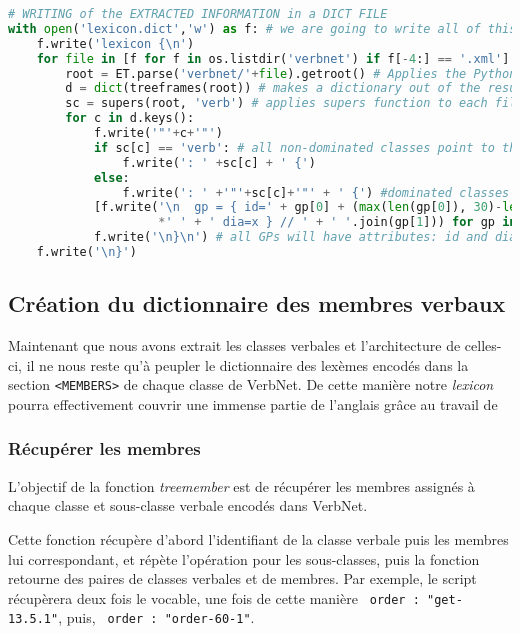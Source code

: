\begin{lstlisting}[language=Python, caption = Importation de l'architecture des classes verbales, label=fig:archivn]
# WRITING of the EXTRACTED INFORMATION in a DICT FILE
with open('lexicon.dict','w') as f: # we are going to write all of this block into lexicon.dict
    f.write('lexicon {\n')
    for file in [f for f in os.listdir('verbnet') if f[-4:] == '.xml']: # open VerbNet XMl files
        root = ET.parse('verbnet/'+file).getroot() # Applies the Python Element Tree module
        d = dict(treeframes(root)) # makes a dictionary out of the results of treeframes on a file
        sc = supers(root, 'verb') # applies supers function to each file
        for c in d.keys():
            f.write('"'+c+'"')
            if sc[c] == 'verb': # all non-dominated classes point to the default verb class
                f.write(': ' +sc[c] + ' {') 
            else:
                f.write(': ' +'"'+sc[c]+'"' + ' {') #dominated classes point towards their governor
            [f.write('\n  gp = { id=' + gp[0] + (max(len(gp[0]), 30)-len(gp[0]))
                     *' ' + ' dia=x } // ' + ' '.join(gp[1])) for gp in d[c]]
            f.write('\n}\n') # all GPs will have attributes: id and dia
    f.write('\n}')
\end{lstlisting}

\subsection{Création du dictionnaire des membres verbaux} \label{extracmembre}

Maintenant que nous avons extrait les classes verbales et l'architecture de celles-ci, il ne nous reste qu'à peupler le dictionnaire des lexèmes encodés dans la section \texttt{<MEMBERS>} de chaque classe de VerbNet. De cette manière notre \emph{lexicon} pourra effectivement couvrir une immense partie de l'anglais grâce au travail de %

\subsubsection{Récupérer les membres}
L'objectif de la fonction \emph{treemember} est de récupérer les membres assignés à chaque classe et sous-classe verbale encodés dans VerbNet.

Cette fonction récupère d'abord l'identifiant de la classe verbale puis les membres lui correspondant, et répète l'opération pour les sous-classes, puis la fonction retourne des paires de classes verbales et de membres. Par exemple, le script récupèrera deux fois le vocable, une fois de cette manière \lstinline| order : "get-13.5.1"|, puis, \lstinline| order : "order-60-1"|.

